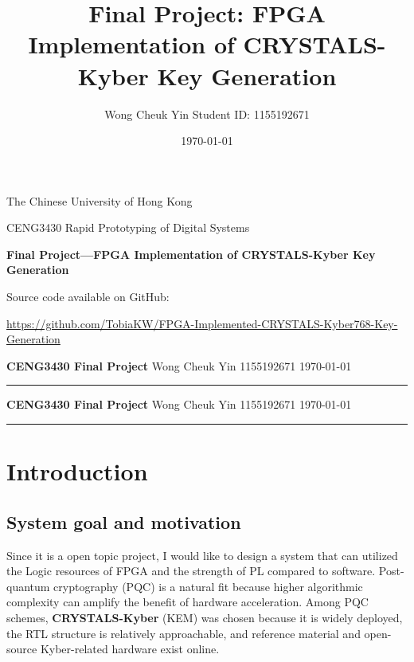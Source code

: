 \documentclass[11pt,a4paper]{article}
\title{Final Project: FPGA Implementation of CRYSTALS-Kyber Key Generation}
\author{Wong Cheuk Yin \quad Student ID: 1155192671}
\date{\today}
\begin{document}
\makeatletter
\begin{titlepage}
  \centering
  \null\vspace*{1.5cm}
  {\large The Chinese University of Hong Kong\par}
  \vspace{1em}
  {\large CENG3430 Rapid Prototyping of Digital Systems\par}
  \vspace{3cm}
  {\LARGE\bfseries Final Project---FPGA Implementation of CRYSTALS-Kyber Key Generation\par}
  \vspace{2em}
  {\large\@author\par}
  \vspace{1em}
  {\large\@date\par}
  \vfill
  {\normalsize Source code available on GitHub:\par}
  \vspace{0.5em}
  {\small\url{https://github.com/TobiaKW/FPGA-Implemented-CRYSTALS-Kyber768-Key-Generation}\par}
  \vspace*{1.5cm}
  \thispagestyle{empty}
\end{titlepage}
\makeatother

{\noindent\large\textbf{CENG3430 Final Project} \hfill Wong Cheuk Yin 1155192671 \hfill \today}
\vspace{0.5em}
\hrule
\vspace{0.5em}
\tableofcontents
\clearpage

\newpage
{\noindent\large\textbf{CENG3430 Final Project} \hfill Wong Cheuk Yin 1155192671 \hfill \today}
\vspace{0.5em}
\hrule
\vspace{0.5em}
\section{Introduction}

\subsection{System goal and motivation}
Since it is a open topic project, I would like to design a system that can utilized the Logic resources of 
FPGA and the strength of PL compared to software. Post-quantum cryptography (PQC) is a natural fit because 
higher algorithmic complexity can amplify the benefit of hardware acceleration. Among PQC schemes, 
\textbf{CRYSTALS-Kyber} (KEM) was chosen because it is widely deployed, the RTL structure is relatively approachable,
 and reference material and open-source Kyber-related hardware exist online.
\end{document}
